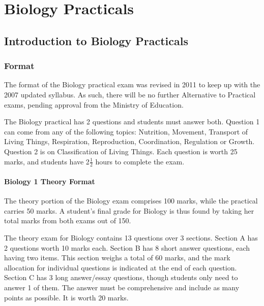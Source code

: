 \chapter{Biology Practicals}

\section{Introduction to Biology Practicals}

\subsection{Format}

%
%

The format of the Biology practical exam was revised in 2011 to keep up with the 2007 updated syllabus. As such, there will be no further Alternative to Practical exams, pending approval from the Ministry of Education.

The Biology practical has 2 questions and students must answer both. Question 1 can come from any of the following topics: Nutrition, Movement, Transport of Living Things, Respiration, Reproduction, Coordination, Regulation or Growth. Question 2 is on Classification of Living Things. Each question is worth 25 marks, and students have 2$\frac{1}{2}$ hours to complete the exam.

\subsubsection{Biology 1 Theory Format}
The theory portion of the Biology exam comprises 100 marks, while the practical carries 50 marks. A student's final grade for Biology is thus found by taking her total marks from both exams out of 150.

The theory exam for Biology contains 13 questions over 3 sections. Section A has 2 questions worth 10 marks each.  Section B has 8 short answer questions, each having two items. This section weighs a total of 60 marks, and the mark allocation for individual questions is indicated at the end of each question. Section C has 3 long answer\slash essay questions, though students only need to answer 1 of them. The answer must be comprehensive and include as many points as possible. It is worth 20 marks.

